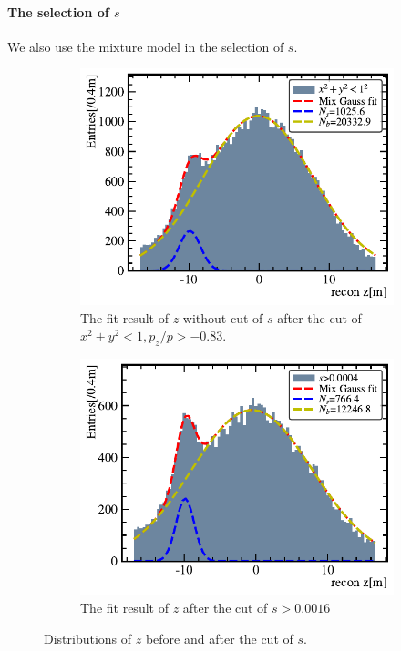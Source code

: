 \paragraph{The selection of $s$}
We also use the mixture model in the selection of $s$.
\begin{figure}[!htbp]
	\centering
	\begin{subfigure}[b]{0.4\textwidth}
		\includegraphics[width=\textwidth]{neutrontag/fastrecon/z_origin.pdf}
		\caption{The fit result of $z$ without cut of $s$ after the cut of $x^2+y^2<1, p_z/p>-0.83$.}
		\label{fast:snucut}
	\end{subfigure}

	\begin{subfigure}[b]{0.4\textwidth}
		\includegraphics[page=6, width=\textwidth]{neutrontag/fastrecon/scoreCut.pdf}
		\caption{The fit result of $z$ after the cut of $s>0.0016$}
		\label{fast:exscut}
	\end{subfigure}
	\caption{Distributions of $z$ before and after the cut of $s$.}
	\label{fast:scut}
\end{figure}

